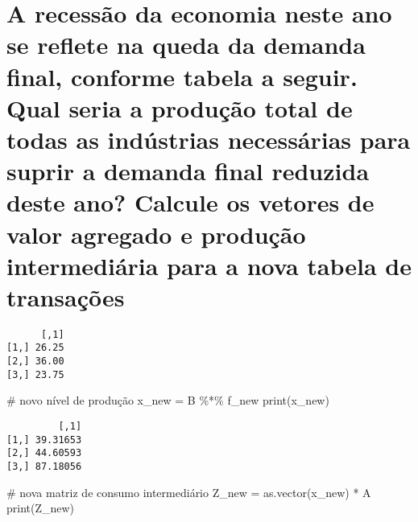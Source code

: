\documentclass[
  letterpaper,
  DIV=11,
  numbers=noendperiod]{scrreprt}
\newenvironment{Shaded}{\begin{snugshade}}{\end{snugshade}}
\newcommand{\CommentTok}[1]{\textcolor[rgb]{0.50,0.62,0.50}{#1}}
\newcommand{\FloatTok}[1]{\textcolor[rgb]{0.75,0.75,0.82}{#1}}
\newcommand{\FunctionTok}[1]{\textcolor[rgb]{0.94,0.94,0.56}{#1}}
\newcommand{\NormalTok}[1]{\textcolor[rgb]{0.80,0.80,0.80}{#1}}
\newcommand{\OtherTok}[1]{\textcolor[rgb]{0.94,0.94,0.56}{#1}}
\newcommand{\SpecialCharTok}[1]{\textcolor[rgb]{0.86,0.64,0.64}{#1}}
\begin{document}
\section{A recessão da economia neste ano se reflete na queda da demanda
final, conforme tabela a seguir. Qual seria a produção total de todas as
indústrias necessárias para suprir a demanda final reduzida deste ano?
Calcule os vetores de valor agregado e produção intermediária para a
nova tabela de
transações}\label{a-recessuxe3o-da-economia-neste-ano-se-reflete-na-queda-da-demanda-final-conforme-tabela-a-seguir.-qual-seria-a-produuxe7uxe3o-total-de-todas-as-induxfastrias-necessuxe1rias-para-suprir-a-demanda-final-reduzida-deste-ano-calcule-os-vetores-de-valor-agregado-e-produuxe7uxe3o-intermediuxe1ria-para-a-nova-tabela-de-transauxe7uxf5es}

\begin{Shaded}
\end{Shaded}

\begin{verbatim}
      [,1]
[1,] 26.25
[2,] 36.00
[3,] 23.75
\end{verbatim}

\begin{Shaded}
\begin{Highlighting}[numbers=left,,]
\CommentTok{\# novo nível de produção}
\NormalTok{x\_new }\OtherTok{=}\NormalTok{ B }\SpecialCharTok{\%*\%}\NormalTok{ f\_new}
\FunctionTok{print}\NormalTok{(x\_new)}
\end{Highlighting}
\end{Shaded}

\begin{verbatim}
         [,1]
[1,] 39.31653
[2,] 44.60593
[3,] 87.18056
\end{verbatim}

\begin{Shaded}
\begin{Highlighting}[numbers=left,,]
\CommentTok{\# nova matriz de consumo intermediário}
\NormalTok{Z\_new }\OtherTok{=} \FunctionTok{as.vector}\NormalTok{(x\_new) }\SpecialCharTok{*}\NormalTok{ A}
\FunctionTok{print}\NormalTok{(Z\_new)}
\end{Highlighting}
\end{Shaded}
\end{document}
